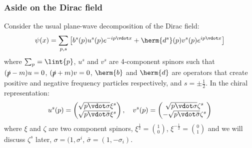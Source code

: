 \documentclass{jknotes}
\begin{document}
\subsubsection{Aside on the Dirac field}
Consider the usual plane-wave decomposition of the Dirac field:
\begin{equation}
    \psi(x) = \sum_{p,s}\left[ b^s(p)u^s(p)e^{-ip\vdot x} + \herm{d^s}(p)v^s(p)e^{ip\vdot x}\right]
\end{equation}
where \(\sum_p = \lint{p}\), \(u^s\) and \(v^s\) are 4-component spinors such that \((\slashed{p}-m)u = 0\), \((\slashed{p}+m)v = 0\), \(\herm{b}\) and \(\herm{d}\) are operators that create positive and negative frequency particles respectively, and \(s = \pm\frac{1}{2}\). In the chiral representation:
\begin{equation}
    u^s(p) = 
    \begin{pmatrix}
        \sqrt{p\vdot\sigma} \xi^s \\ \sqrt{p\vdot\bar{\sigma}} \xi^s
    \end{pmatrix}
    ,\quad
    v^s(p) = 
    \begin{pmatrix}
        \sqrt{p\vdot\sigma} \zeta^s \\ -\sqrt{p\vdot\bar{\sigma}} \zeta^s
    \end{pmatrix}
\end{equation}
where \(\xi\) and \(\zeta\) are two component spinors, \(\xi^{\frac{1}{2}} = {1 \choose 0}\), \(\xi^{-\frac{1}{2}} = {0 \choose 1}\) and we will discuss \(\zeta^s\) later, \(\sigma = (1,\sigma^i\), \(\bar{\sigma} = (1,-\sigma_i)\).
\end{document}
